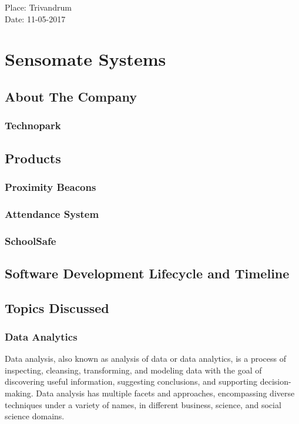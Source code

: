 \documentclass[a4paper,12pt]{report}
\begin{document}
\begin{titlepage}
		\begin{flushleft}
		Place: Trivandrum\\
		Date:  11-05-2017\\
		\end{flushleft}
		\vfill %
	\end{titlepage}

	
	\newpage
	\tableofcontents
	\newpage

	\chapter{Sensomate Systems}
		\section{About The Company}
			\subsection{Technopark}
		\section{Products}
			\subsection{Proximity Beacons}
			\subsection{Attendance System}
			\subsection{SchoolSafe}
		\section{Software Development Lifecycle and Timeline}
		\section{Topics Discussed}
			\subsection{Data Analytics}
			Data analysis, also known as analysis of data or data analytics, is a process of inspecting, cleansing, transforming, and modeling data with the goal of discovering useful information, suggesting conclusions, and supporting decision-making. Data analysis has multiple facets and approaches, encompassing diverse techniques under a variety of names, in different business, science, and social science domains.
\end{document}
